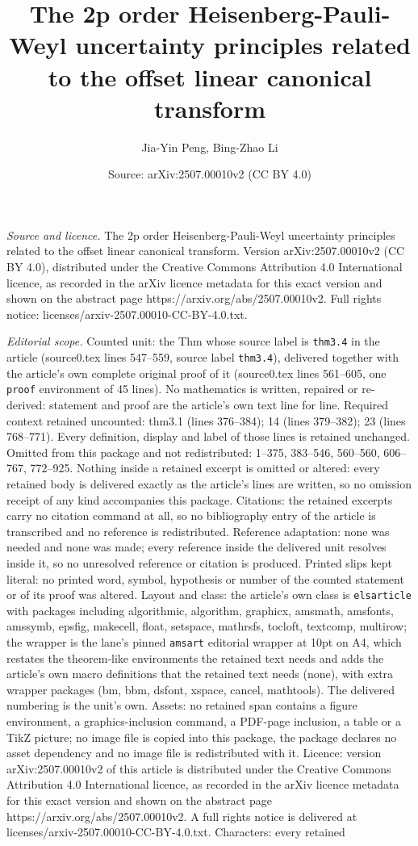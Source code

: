 \documentclass[10pt,a4paper]{amsart}
\title[The 2p order Heisenberg-Pauli-Weyl uncertainty principles re]{The 2p order Heisenberg-Pauli-Weyl uncertainty principles related to the offset linear canonical transform}
\author{Jia-Yin Peng, Bing-Zhao Li}
\date{Source: arXiv:2507.00010v2 (CC BY 4.0)}
\begin{document}
\maketitle

\noindent\emph{Source and licence.} The 2p order Heisenberg-Pauli-Weyl uncertainty principles related to the offset linear canonical transform. Version arXiv:2507.00010v2 (CC BY 4.0), distributed under the Creative Commons Attribution 4.0 International licence, as recorded in the arXiv licence metadata for this exact version and shown on the abstract page https://arxiv.org/abs/2507.00010v2. Full rights notice: licenses/arxiv-2507.00010-CC-BY-4.0.txt.\par\smallskip

\noindent\textit{Editorial scope.} Counted unit: the Thm whose source label is \texttt{thm3.4} in the article (source0.tex lines 547--559, source label \texttt{thm3.4}), delivered together with the article's own complete original proof of it (source0.tex lines 561--605, one \texttt{proof} environment of 45 lines). No mathematics is written, repaired or re-derived: statement and proof are the article's own text line for line. Required context retained uncounted: thm3.1 (lines 376--384); 14 (lines 379--382); 23 (lines 768--771). Every definition, display and label of those lines is retained unchanged. Omitted from this package and not redistributed: 1--375, 383--546, 560--560, 606--767, 772--925. Nothing inside a retained excerpt is omitted or altered: every retained body is delivered exactly as the article's lines are written, so no omission receipt of any kind accompanies this package. Citations: the retained excerpts carry no citation command at all, so no bibliography entry of the article is transcribed and no reference is redistributed. Reference adaptation: none was needed and none was made; every reference inside the delivered unit resolves inside it, so no unresolved reference or citation is produced. Printed slips kept literal: no printed word, symbol, hypothesis or number of the counted statement or of its proof was altered. Layout and class: the article's own class is \texttt{elsarticle} with packages including algorithmic, algorithm, graphicx, amsmath, amsfonts, amssymb, epsfig, makecell, float, setspace, mathrsfs, tocloft, textcomp, multirow; the wrapper is the lane's pinned \texttt{amsart} editorial wrapper at 10pt on A4, which restates the theorem-like environments the retained text needs and adds the article's own macro definitions that the retained text needs (none), with extra wrapper packages (bm, bbm, dsfont, xspace, cancel, mathtools). The delivered numbering is the unit's own. Assets: no retained span contains a figure environment, a graphics-inclusion command, a PDF-page inclusion, a table or a TikZ picture; no image file is copied into this package, the package declares no asset dependency and no image file is redistributed with it. Licence: version arXiv:2507.00010v2 of this article is distributed under the Creative Commons Attribution 4.0 International licence, as recorded in the arXiv licence metadata for this exact version and shown on the abstract page https://arxiv.org/abs/2507.00010v2. A full rights notice is delivered at licenses/arxiv-2507.00010-CC-BY-4.0.txt. Characters: every retained 
\end{document}
